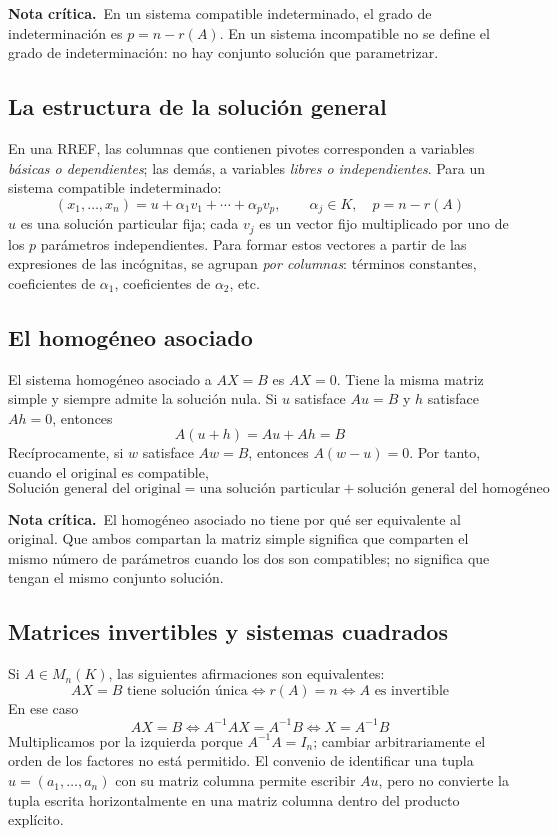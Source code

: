 \documentclass[11pt,a4paper]{article}
\newcommand{\anote}[1]{\par{\color{rednote}\textbf{Nota crítica.}\ #1}\par}
\begin{document}
\anote{En un sistema compatible indeterminado, el grado de indeterminación es $p=n-r(A)$. En un sistema incompatible no se define el grado de indeterminación: no hay conjunto solución que parametrizar.}

\subsection{La estructura de la solución general}
En una RREF, las columnas que contienen pivotes corresponden a variables \emph{básicas o dependientes}; las demás, a variables \emph{libres o independientes}. Para un sistema compatible indeterminado:
\[
(x_1,\ldots,x_n)=u+\alpha_1v_1+\cdots+\alpha_pv_p,
\qquad\alpha_j\in K,\quad p=n-r(A)
\]
$u$ es una solución particular fija; cada $v_j$ es un vector fijo multiplicado por uno de los $p$ parámetros independientes. Para formar estos vectores a partir de las expresiones de las incógnitas, se agrupan \emph{por columnas}: términos constantes, coeficientes de $\alpha_1$, coeficientes de $\alpha_2$, etc.

\subsection{El homogéneo asociado}
El sistema homogéneo asociado a $AX=B$ es $AX=0$. Tiene la misma matriz simple y siempre admite la solución nula. Si $u$ satisface $Au=B$ y $h$ satisface $Ah=0$, entonces
\[
A(u+h)=Au+Ah=B
\]
Recíprocamente, si $w$ satisface $Aw=B$, entonces $A(w-u)=0$. Por tanto, cuando el original es compatible,
\[
\boxed{\text{Solución general del original}
=\text{una solución particular}
+\text{solución general del homogéneo}}
\]
\anote{El homogéneo asociado no tiene por qué ser equivalente al original. Que ambos compartan la matriz simple significa que comparten el mismo número de parámetros cuando los dos son compatibles; no significa que tengan el mismo conjunto solución.}

\subsection{Matrices invertibles y sistemas cuadrados}
Si $A\in M_n(K)$, las siguientes afirmaciones son equivalentes:
\[
AX=B\text{ tiene solución única}
\iff r(A)=n
\iff A\text{ es invertible}
\]
En ese caso
\[
AX=B\iff A^{-1}AX=A^{-1}B\iff \boxed{X=A^{-1}B}
\]
Multiplicamos por la izquierda porque $A^{-1}A=I_n$; cambiar arbitrariamente el orden de los factores no está permitido. El convenio de identificar una tupla $u=(a_1,\ldots,a_n)$ con su matriz columna permite escribir $Au$, pero no convierte la tupla escrita horizontalmente en una matriz columna dentro del producto explícito.
\end{document}
